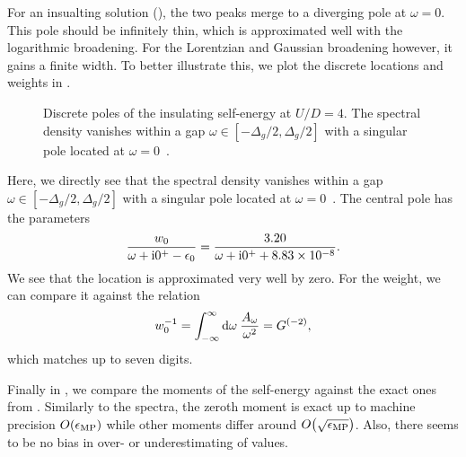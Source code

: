 For an insualting solution (),
the two peaks merge to a diverging pole at $\omega=0$.
This pole should be infinitely thin, which is approximated well with the logarithmic broadening.
For the Lorentzian and Gaussian broadening however, it gains a finite width.
To better illustrate this,
we plot the discrete locations and weights in .
\begin{figure}[ht]
    \centering
    
    \caption{
        Discrete poles of the insulating self-energy at $U/D=4$.
        The spectral density vanishes within a gap $\omega\in[-\Delta_g/2, \Delta_g/2]$
        with a singular pole located at $\omega=0$~\cite{Georges1996}.
    }%
    \label{fig:self-energy-poles}
\end{figure}
Here, we directly see that the spectral density vanishes
within a gap $\omega\in[-\Delta_g/2, \Delta_g/2]$
with a singular pole located at $\omega=0$~\cite{Georges1996}.
The central pole has the parameters
\begin{equation}
    \frac{w_0}{\omega + \mathrm{i}0^+ - \epsilon_0}
    =
    \frac{\num{3.20}}{\omega + \mathrm{i}0^+ + \num{8.83e-8}}.
\end{equation}
We see that the location is approximated very well by zero.
For the weight, we can compare it against the relation~\cite{Georges1996}
\begin{equation}
    w_0^{-1} = \int_{-\infty}^{\infty} \mathrm{d} \omega\> \frac{A_\omega}{\omega^2} = G^{(-2)},
\end{equation}
which matches up to seven digits.

Finally in ,
we compare the moments of the self-energy against the exact ones
from .
Similarly to the spectra,
the zeroth moment is exact up to machine precision $O\!\left(\epsilon_\mathrm{MP}\right)$
while other moments differ around $O\!\left(\sqrt{\epsilon_\mathrm{MP}}\right)$.
Also, there seems to be no bias in over- or underestimating of values.
\begin{table}[ht]
    \caption{
        Difference $\Delta \Sigma^{(n)}$ of the $n$-th moment of the self-energy $\Sigma$
        to the exact value.
        $\Sigma^\mH$ is the Hartree term.
    }%
    \label{tab:self-energy-moments}
    \centering
\end{table}

